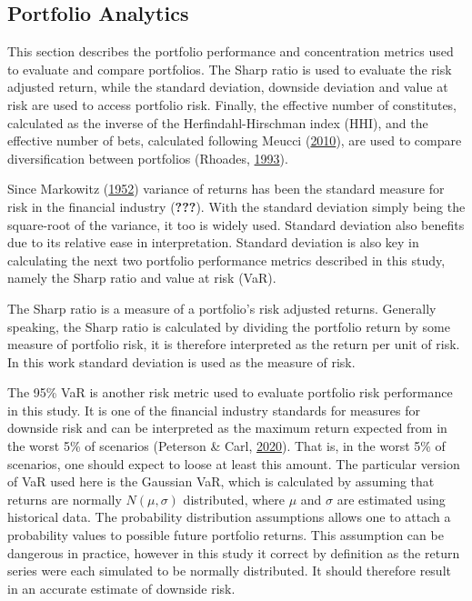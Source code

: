 \documentclass[11pt,preprint, authoryear]{elsarticle}
\numberwithin{equation}{section}
\numberwithin{figure}{section}
\numberwithin{table}{section}
\begin{document}
\hypertarget{portfolio-analytics}{%
\subsection{\texorpdfstring{Portfolio Analytics
\label{portmet}}{Portfolio Analytics }}\label{portfolio-analytics}}

This section describes the portfolio performance and concentration
metrics used to evaluate and compare portfolios. The Sharp ratio is used
to evaluate the risk adjusted return, while the standard deviation,
downside deviation and value at risk are used to access portfolio risk.
Finally, the effective number of constitutes, calculated as the inverse
of the Herfindahl-Hirschman index (HHI), and the effective number of
bets, calculated following Meucci
(\protect\hyperlink{ref-meucci2010}{2010}), are used to compare
diversification between portfolios (Rhoades,
\protect\hyperlink{ref-rhoades1993}{1993}).

Since Markowitz (\protect\hyperlink{ref-markowitz}{1952}) variance of
returns has been the standard measure for risk in the financial industry
({\textbf{???}}). With the standard deviation simply being the
square-root of the variance, it too is widely used. Standard deviation
also benefits due to its relative ease in interpretation. Standard
deviation is also key in calculating the next two portfolio performance
metrics described in this study, namely the Sharp ratio and value at
risk (VaR).

The Sharp ratio is a measure of a portfolio's risk adjusted returns.
Generally speaking, the Sharp ratio is calculated by dividing the
portfolio return by some measure of portfolio risk, it is therefore
interpreted as the return per unit of risk. In this work standard
deviation is used as the measure of risk.

The 95\% VaR is another risk metric used to evaluate portfolio risk
performance in this study. It is one of the financial industry standards
for measures for downside risk and can be interpreted as the maximum
return expected from in the worst 5\% of scenarios (Peterson \& Carl,
\protect\hyperlink{ref-PerformanceAnalytics}{2020}). That is, in the
worst 5\% of scenarios, one should expect to loose at least this amount.
The particular version of VaR used here is the Gaussian VaR, which is
calculated by assuming that returns are normally \(N(\mu,\sigma)\)
distributed, where \(\mu\) and \(\sigma\) are estimated using historical
data. The probability distribution assumptions allows one to attach a
probability values to possible future portfolio returns. This assumption
can be dangerous in practice, however in this study it correct by
definition as the return series were each simulated to be normally
distributed. It should therefore result in an accurate estimate of
downside risk.
\end{document}
